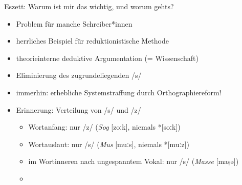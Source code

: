 \begin{frame}
  {Eszett: Warum ist mir das wichtig, und worum gehts?}
  \pause
  \begin{itemize}[<+->]
    \item Problem für manche Schreiber*innen
    \item herrliches Beispiel für reduktionistische Methode
    \item theorieinterne deduktive Argumentation (= Wissenschaft)
    \item Eliminierung des zugrundeliegenden /s/
      \Halbzeile
    \item immerhin: erhebliche \alert{Systemstraffung} durch Orthographiereform!
      \Halbzeile
    \item Erinnerung: Verteilung von /s/ und /z/
      \begin{itemize}[<+->]
        \item Wortanfang: nur /z/ (\textit{Sog} [zoːk], niemals *[soːk])
        \item Wortauslaut: nur /s/ (\textit{Mus} [muːs], niemals *[muːz])
        \item \alert{im Wortinneren nach ungespanntem Vokal: nur /s/ (\textit{Masse} [maṣə])}
        \item {}
      \end{itemize}
  \end{itemize}
\end{frame}


\newcommand{\phopro}{\ensuremath{\Rightarrow}}

